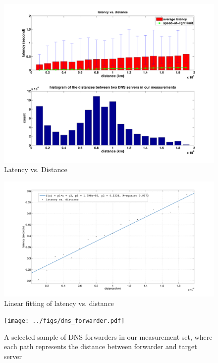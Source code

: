 \begin{figure}
  \centering
  \includegraphics[width=\linewidth]{../figs/King_latency_dist.pdf}
  \vspace{-1em}
  \caption{Latency vs. Distance}
  \label{fig:latency_dist}
\end{figure}

\begin{figure}
  \centering
  \includegraphics[width=\linewidth]{../figs/fit_curve.pdf}
  \vspace{-1em}
  \caption{Linear fitting of latency vs. distance}
  \label{fig:fit_curve}
\end{figure}

\begin{figure}[t]
  \centering
  \texttt{[image: ../figs/dns\_forwarder.pdf]}
  \vspace{-1em}
  \caption{A selected sample of DNS forwarders in our measurement set, where each path represents the distance between forwarder and target server}
  \label{fig:forwarder_viz}
\end{figure}

